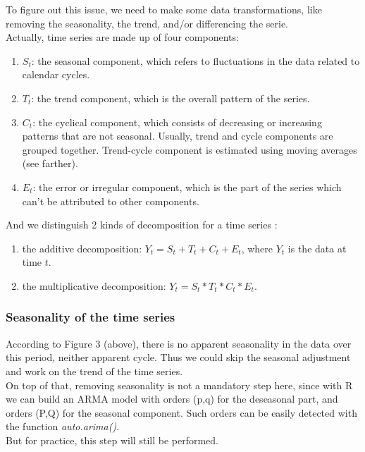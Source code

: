 To figure out this issue, we need to make some data transformations, like removing the seasonality, the trend, and/or differencing the serie. \\

Actually, time series are made up of four components:
\begin{enumerate}
  \item $S_t$: the seasonal component, which refers to fluctuations in the data related to calendar cycles.
  \item $T_t$: the trend component, which is the overall pattern of the series.
  \item $C_t$: the cyclical component, which consists of decreasing or increasing patterns that are not seasonal. Usually, trend and cycle components are grouped together. Trend-cycle component is estimated using moving averages (see farther).
  \item $E_t$: the error or irregular component, which is the part of the series which can't be attributed to other components.
\end{enumerate}
And we distinguish 2 kinds of decomposition for a time series :
\begin{enumerate}
  \item the additive decomposition: $Y_t = S_t + T_t + C_t + E_t$, where $Y_t$ is the data at time $t$.
  \item the multiplicative decomposition: $Y_t = S_t * T_t * C_t * E_t$.
\end{enumerate}

\subsubsection{Seasonality of the time series}
According to Figure 3 (above), there is no apparent seasonality in the data over this period, neither apparent cycle. Thus we could skip the seasonal adjustment and work on the trend of the time series. \\
On top of that, removing seasonality is not a mandatory step here, since with R we can build an ARMA model with orders (p,q) for the deseasonal part, and orders (P,Q) for the seasonal component. Such orders can be easily detected with the function \textit{auto.arima()}. \\
But for practice, this step will still be performed.

